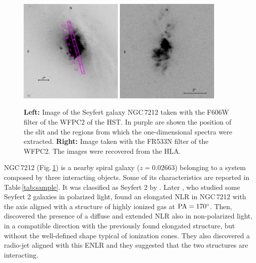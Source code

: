 \documentclass[../main.tex]{subfiles}
\begin{document}
\begin{figure}
\centering
\includegraphics[width=0.45\textwidth]{images/paper1/ngc7212slit.jpg} 
\quad
\includegraphics[width=0.45\textwidth]{images/paper1/NGC7212_o3_2.pdf}
\caption[]{\textbf{Left:} Image of the Seyfert galaxy NGC\,7212 taken with the F606W filter of the WFPC2 of the HST. In purple are shown the position of the slit and the regions from which the one-dimensional spectra were extracted. \textbf{Right:} Image taken with the FR533N filter of the WFPC2. The images were recovered from the HLA.
}
\label{fig:NGC7212}
\end{figure}

NGC\,7212 (Fig.\,\ref{fig:NGC7212}) is a nearby spiral galaxy ($z=0.02663$) belonging to a system composed by three interacting objects.
Some of its characteristics are reported in Table\,\ref{tab:sample}.
It was classified as Seyfert 2 by \citet{Wasilewski81}.
Later \citet{Tran95}, who studied some Seyfert 2 galaxies in polarized light, found an elongated NLR in NGC\,7212 with the axis aligned with a structure of highly ionized gas at $\rm PA=\ang{170}$.
Then, \citet{Falcke98} discovered the presence of a diffuse and extended NLR also in non-polarized light, in a compatible direction with the previously found elongated structure, but without the well-defined shape typical of ionization cones.
They also discovered a radio-jet aligned with this ENLR and they suggested that the two structures are interacting.
\end{document}
